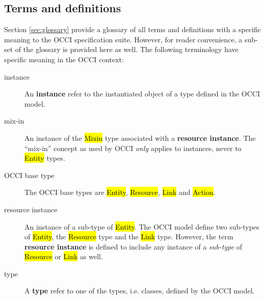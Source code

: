 \documentclass[10pt,a4paper,british]{article}
\begin{document}
\subsection{Terms and definitions}
Section \ref{sec:glossary} provide a glossary of all terms and definitions with
a specific meaning to the OCCI specification suite. However, for reader
convenience, a sub-set of the glossary is provided here as well. The following
terminology have specific meaning in the OCCI context:
\begin{description}
\item[instance] An {\bf instance} refer to the instantiated object of a type
 defined in the OCCI model.
\item[mix-in] An instance of the \hl{Mixin} type associated with a {\bf resource
 instance}. The ``mix-in'' concept as used by OCCI {\em only} applies to
 instances, never to \hl{Entity} types.
\item[OCCI base type] The OCCI base types are \hl{Entity}, \hl{Resource},
 \hl{Link} and \hl{Action}.
\item[resource instance] An instance of a sub-type of \hl{Entity}. The OCCI
 model define two sub-types of \hl{Entity}, the \hl{Resource} type and the
 \hl{Link} type.  However, the term {\bf resource instance} is defined to
 include any instance of a {\em sub-type} of \hl{Resource} or \hl{Link} as
 well.
\item[type] A {\bf type} refer to one of the types, i.e. classes, defined by
 the OCCI model.
\end{description}
\end{document}
